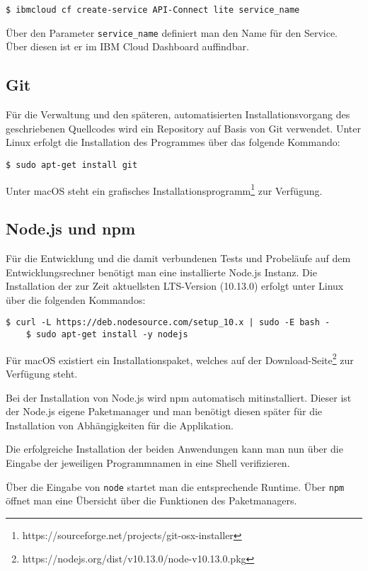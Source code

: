 \begin{lstlisting}[caption=Instanziierung von API Connect, label=ls:vorbereitung_apiconnect]
$ ibmcloud cf create-service API-Connect lite service_name
\end{lstlisting}

Über den Parameter \texttt{service\_name} definiert man den Name für den Service. Über diesen ist er im IBM Cloud
Dashboard auffindbar.

\subsection{Git}
Für die Verwaltung und den späteren, automatisierten Installationsvorgang des geschriebenen Quellcodes wird ein
Repository auf Basis von Git verwendet. Unter Linux erfolgt die Installation des Programmes über das folgende Kommando:

\begin{lstlisting}[caption=Installation von Git, label=ls:vorbereitung_git]
    $ sudo apt-get install git
\end{lstlisting}

Unter macOS steht ein grafisches Installationsprogramm\footnote{https://sourceforge.net/projects/git-osx-installer} zur
Verfügung.

\subsection{Node.js und npm}
Für die Entwicklung und die damit verbundenen Tests und Probeläufe auf dem Entwicklungsrechner benötigt man eine
installierte Node.js Instanz. Die Installation der zur Zeit aktuellsten LTS-Version (10.13.0) erfolgt unter Linux über
die folgenden Kommandos:

\begin{lstlisting}[caption=Installation von Node.js und npm, label=ls:vorbereitung_nodejs]
    $ curl -L https://deb.nodesource.com/setup_10.x | sudo -E bash -
    $ sudo apt-get install -y nodejs
\end{lstlisting}

Für macOS existiert ein Installationspaket, welches auf der
Download-Seite\footnote{https://nodejs.org/dist/v10.13.0/node-v10.13.0.pkg} zur Verfügung steht.

Bei der Installation von Node.js wird npm automatisch mitinstalliert. Dieser ist der Node.js eigene Paketmanager und
man benötigt diesen später für die Installation von Abhängigkeiten für die Applikation.

Die erfolgreiche Installation der beiden Anwendungen kann man nun über die Eingabe der jeweiligen Programmnamen in eine
Shell verifizieren.

Über die Eingabe von \texttt{node} startet man die entsprechende Runtime. Über \texttt{npm} öffnet man eine Übersicht
über die Funktionen des Paketmanagers.